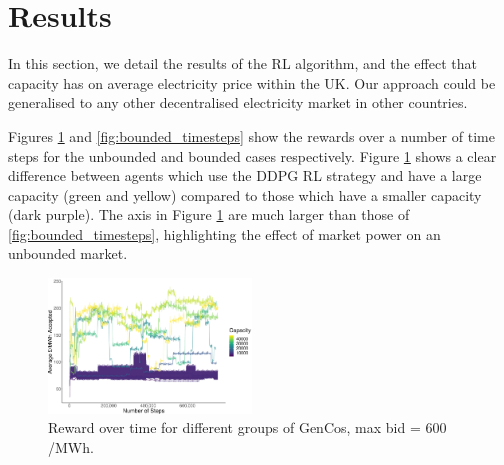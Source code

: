 \documentclass[conference]{IEEEtran}
\begin{document}







\section{Results}
\label{sec:results}

In this section, we detail the results of the RL algorithm, and the effect that capacity has on average electricity price within the UK. Our approach could be generalised to any other decentralised electricity market in other countries. 

Figures \ref{fig:unbounded_timesteps} and \ref{fig:bounded_timesteps} show the rewards over a number of time steps for the unbounded and bounded cases respectively. Figure \ref{fig:unbounded_timesteps} shows a clear difference between agents which use the DDPG RL strategy and have a large capacity (green and yellow) compared to those which have a smaller capacity (dark purple). The axis in Figure \ref{fig:unbounded_timesteps} are much larger than those of \ref{fig:bounded_timesteps}, highlighting the effect of market power on an unbounded market.


\begin{figure}[htbp]
    \includegraphics[width=0.48\textwidth]{figures/results/unbounded_results.pdf}
    \caption{Reward over time for different groups of GenCos, max bid = \textsterling $600$/MWh.}
    \label{fig:unbounded_timesteps}
\end{figure}
\end{document}
